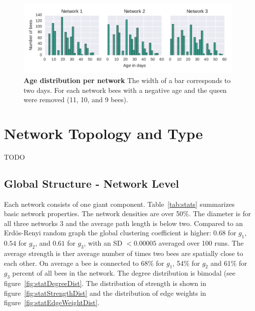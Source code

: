 \begin{figure}[htb]
	\centering
	\includegraphics[width=1.0\textwidth]{Figures/ages}
	\caption[Age distribution per network]{\textbf{Age distribution per network} The width of a bar corresponds to two days. For each network bees with a negative age and the queen were removed (11, 10, and 9 bees).}
	\label{fig:ages}
\end{figure}

\section{Network Topology and Type}
TODO
\subsection{Global Structure - Network Level}
Each network consists of one giant component. Table~\ref{tab:stats} summarizes basic network properties. The network densities are over 50\%. The diameter is for all three networks 3 and the average path length is below two. Compared to an Erdös-Renyi random graph the global clustering coefficient is higher: $0.68$ for $g_1$, $0.54$ for $g_2$, and $0.61$ for $g_3$, with an SD $<0.00005$ averaged over 100 runs. The average strength is ther average number of times two bees are spatially close to each other. On average a bee is connected to 68\% for $g_1$, 54\% for $g_2$ and 61\% for $g_3$ percent of all bees in the network. The degree distribution is bimodal (see figure~\ref{fig:statDegreeDist}. The distribution of strength is shown in figure~\ref{fig:statStrengthDist} and the distribution of edge weights in figure~\ref{fig:statEdgeWeightDist}.

